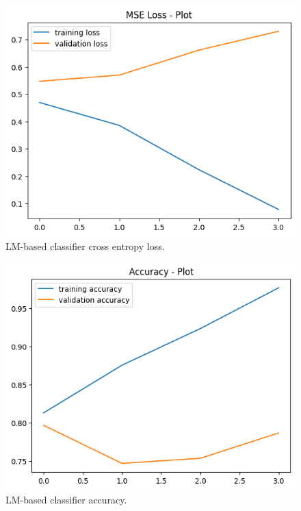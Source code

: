 \documentclass[11pt]{article}
\begin{document}
\begin{figure}
    \includegraphics[width=\linewidth]{loss-yes-transformer.png}
    \caption{LM-based classifier cross entropy loss.}
    \label{fig:3}
\end{figure}
	
\begin{figure}
    \includegraphics[width=\linewidth]{accuracy-yes-transformer.png}
    \caption{LM-based classifier accuracy.}
    \label{fig:4}
\end{figure}
	
	
\end{document}
